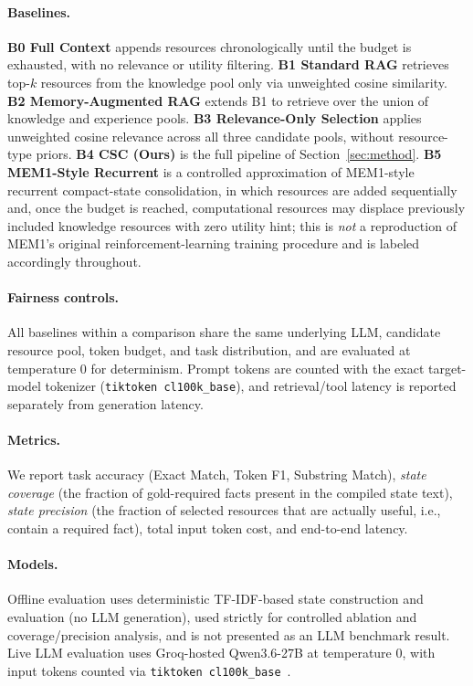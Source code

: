 \documentclass{article}
\begin{document}
\paragraph{Baselines.} \textbf{B0 Full Context} appends resources chronologically until the budget is exhausted, with no relevance or utility filtering. \textbf{B1 Standard RAG} retrieves top-$k$ resources from the knowledge pool only via unweighted cosine similarity. \textbf{B2 Memory-Augmented RAG} extends B1 to retrieve over the union of knowledge and experience pools. \textbf{B3 Relevance-Only Selection} applies unweighted cosine relevance across all three candidate pools, without resource-type priors. \textbf{B4 CSC (Ours)} is the full pipeline of Section~\ref{sec:method}. \textbf{B5 MEM1-Style Recurrent} is a controlled approximation of MEM1-style~\citep{zhou2025mem1} recurrent compact-state consolidation, in which resources are added sequentially and, once the budget is reached, computational resources may displace previously included knowledge resources with zero utility hint; this is \emph{not} a reproduction of MEM1's original reinforcement-learning training procedure and is labeled accordingly throughout.

\paragraph{Fairness controls.} All baselines within a comparison share the same underlying LLM, candidate resource pool, token budget, and task distribution, and are evaluated at temperature 0 for determinism. Prompt tokens are counted with the exact target-model tokenizer (\texttt{tiktoken cl100k\_base}), and retrieval/tool latency is reported separately from generation latency.

\paragraph{Metrics.} We report task accuracy (Exact Match, Token F1, Substring Match), \emph{state coverage} (the fraction of gold-required facts present in the compiled state text), \emph{state precision} (the fraction of selected resources that are actually useful, i.e., contain a required fact), total input token cost, and end-to-end latency.

\paragraph{Models.} Offline evaluation uses deterministic TF-IDF-based state construction and evaluation (no LLM generation), used strictly for controlled ablation and coverage/precision analysis, and is not presented as an LLM benchmark result. Live LLM evaluation uses Groq-hosted Qwen3.6-27B at temperature 0, with input tokens counted via \texttt{tiktoken cl100k\_base}~\citep{tiktoken}.
\end{document}

